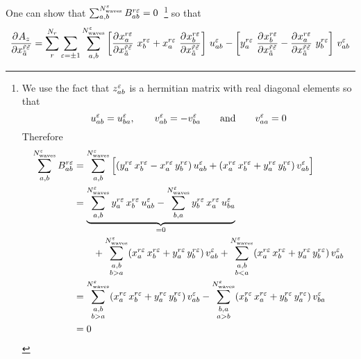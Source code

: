 One can show that $\sum_{a, b}^{N^\varepsilon_\text{waves}} B^{r \varepsilon}_{a b} = 0$~\footnote{%
%
  We use the fact that $z^\varepsilon_{a b}$ is a hermitian matrix with real
  diagonal elements so that
  \begin{equation}
    \label{eq:z_hermitian}
    u^{\varepsilon}_{a b} = u^{\varepsilon}_{b a},
    \qquad
    v^{\varepsilon}_{a b} = - v^{\varepsilon}_{b a}
    \qquad\text{and}\qquad
    v^{\varepsilon}_{a a} = 0
  \end{equation}
  Therefore
  \begin{align*}
    \sum_{a, b}^{N^\refl_\text{waves}} B^{r \refl}_{a b}
    &= \sum_{a, b}^{N^\refl_\text{waves}}
    \sBrk[2]{(y_a^{r \refl}\, x_b^{r \refl} - x_a^{r \refl}\, y_b^{r \refl})\, u^\refl_{a b}
      + (x_a^{r \refl}\, x_b^{r \refl} + y_a^{r \refl}\, y_b^{r \refl})\, v^\refl_{a b}} \\
    &= \underbrace{\sum_{a, b}^{N^\refl_\text{waves}} y_a^{r \refl}\, x_b^{r \refl}\, u^\refl_{a b}
                 - \sum_{b, a}^{N^\refl_\text{waves}} y_b^{r \refl}\, x_a^{r \refl}\, u^\refl_{b a}}_{= 0} \\
    &\qquad + \sum_{\substack{a, b \\ b > a}}^{N^\refl_\text{waves}} (x_a^{r \refl}\, x_b^{r \refl} + y_a^{r \refl}\, y_b^{r \refl})\, v^\refl_{a b}
            + \sum_{\substack{a, b \\ b < a}}^{N^\refl_\text{waves}} (x_a^{r \refl}\, x_b^{r \refl} + y_a^{r \refl}\, y_b^{r \refl})\, v^\refl_{a b} \\
    &=   \sum_{\substack{a, b \\ b > a}}^{N^\refl_\text{waves}} (x_a^{r \refl}\, x_b^{r \refl} + y_a^{r \refl}\, y_b^{r \refl})\, v^\refl_{a b}
       - \sum_{\substack{b, a \\ a > b}}^{N^\refl_\text{waves}} (x_b^{r \refl}\, x_a^{r \refl} + y_b^{r \refl}\, y_a^{r \refl})\, v^\refl_{b a} \\
    &= 0
  \end{align*}
%
} so that
\begin{equation}
  \dpd{A_z}{{x_{\tilde{a}}^{\tilde{r} \tilde{\refl}}}}
  = \sum_r^{N_r} \sum_{\refl = \pm 1} \sum_{a, b}^{N^\refl_\text{waves}}
  \sBrk[3]{\dpd{x_a^{r \refl}}{{x_{\tilde{a}}^{\tilde{r} \tilde{\refl}}}}\, x_b^{r \refl}
    + x_a^{r \refl}\, \dpd{x_b^{r \refl}}{{x_{\tilde{a}}^{\tilde{r} \tilde{\refl}}}}}\, u^\refl_{a b}
  - \sBrk[3]{y_a^{r \refl}\, \dpd{x_b^{r \refl}}{{x_{\tilde{a}}^{\tilde{r} \tilde{\refl}}}}
    - \dpd{x_a^{r \refl}}{{x_{\tilde{a}}^{\tilde{r} \tilde{\refl}}}}\, y_b^{r \refl}}\, v^\refl_{a b}
\end{equation}
